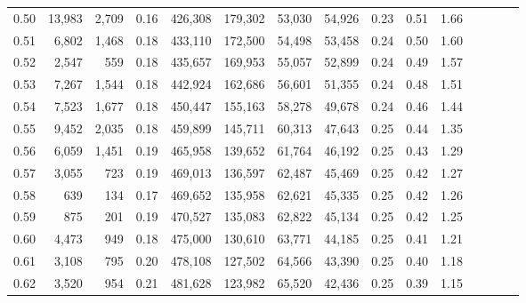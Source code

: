 \begin{tabular}{rrrcrrrrrrrrrrr}
0.50 &  13,983 &  2,709 &                                       0.16 &  426,308 &  179,302 &   53,030 &   54,926 &  0.23 &  0.51 &                         1.66 \\
0.51 &   6,802 &  1,468 &                                       0.18 &  433,110 &  172,500 &   54,498 &   53,458 &  0.24 &  0.50 &                         1.60 \\
0.52 &   2,547 &    559 &                                       0.18 &  435,657 &  169,953 &   55,057 &   52,899 &  0.24 &  0.49 &                         1.57 \\
0.53 &   7,267 &  1,544 &                                       0.18 &  442,924 &  162,686 &   56,601 &   51,355 &  0.24 &  0.48 &                         1.51 \\
0.54 &   7,523 &  1,677 &                                       0.18 &  450,447 &  155,163 &   58,278 &   49,678 &  0.24 &  0.46 &                         1.44 \\
0.55 &   9,452 &  2,035 &                                       0.18 &  459,899 &  145,711 &   60,313 &   47,643 &  0.25 &  0.44 &                         1.35 \\
0.56 &   6,059 &  1,451 &                                       0.19 &  465,958 &  139,652 &   61,764 &   46,192 &  0.25 &  0.43 &                         1.29 \\
0.57 &   3,055 &    723 &                                       0.19 &  469,013 &  136,597 &   62,487 &   45,469 &  0.25 &  0.42 &                         1.27 \\
0.58 &     639 &    134 &                                       0.17 &  469,652 &  135,958 &   62,621 &   45,335 &  0.25 &  0.42 &                         1.26 \\
0.59 &     875 &    201 &                                       0.19 &  470,527 &  135,083 &   62,822 &   45,134 &  0.25 &  0.42 &                         1.25 \\
0.60 &   4,473 &    949 &                                       0.18 &  475,000 &  130,610 &   63,771 &   44,185 &  0.25 &  0.41 &                         1.21 \\
0.61 &   3,108 &    795 &                                       0.20 &  478,108 &  127,502 &   64,566 &   43,390 &  0.25 &  0.40 &                         1.18 \\
0.62 &   3,520 &    954 &                                       0.21 &  481,628 &  123,982 &   65,520 &   42,436 &  0.25 &  0.39 &                         1.15 \\

\end{tabular}
